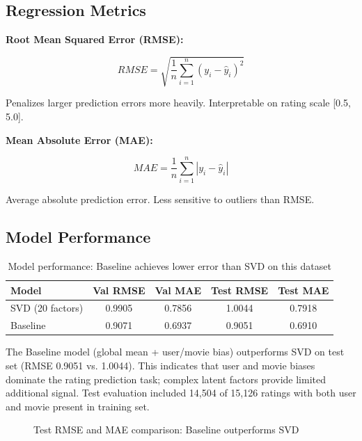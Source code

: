 \documentclass[11pt,a4paper]{article}
\begin{document}
\subsection{Regression Metrics}

\textbf{Root Mean Squared Error (RMSE):}

\begin{equation}
RMSE = \sqrt{\frac{1}{n}\sum_{i=1}^{n}(y_i-\hat{y}_i)^2}
\end{equation}

Penalizes larger prediction errors more heavily. Interpretable on rating scale [0.5, 5.0].

\textbf{Mean Absolute Error (MAE):}

\begin{equation}
MAE = \frac{1}{n}\sum_{i=1}^{n}|y_i-\hat{y}_i|
\end{equation}

Average absolute prediction error. Less sensitive to outliers than RMSE.

\subsection{Model Performance}

\begin{table}[H]
\centering
\begin{tabular}{lcccc}
\toprule
\textbf{Model} & \textbf{Val RMSE} & \textbf{Val MAE} & \textbf{Test RMSE} & \textbf{Test MAE} \\
\midrule
SVD (20 factors) & 0.9905 & 0.7856 & 1.0044 & 0.7918 \\
Baseline & 0.9071 & 0.6937 & 0.9051 & 0.6910 \\
\bottomrule
\end{tabular}
\caption{Model performance: Baseline achieves lower error than SVD on this dataset}
\label{tab:model_comparison}
\end{table}

The Baseline model (global mean + user/movie bias) outperforms SVD on test set (RMSE 0.9051 vs. 1.0044). This indicates that user and movie biases dominate the rating prediction task; complex latent factors provide limited additional signal. Test evaluation included 14,504 of 15,126 ratings with both user and movie present in training set.

\begin{figure}[H]
\centering
{}
\caption{Test RMSE and MAE comparison: Baseline outperforms SVD}
\label{fig:model_comparison}
\end{figure}
\end{document}
